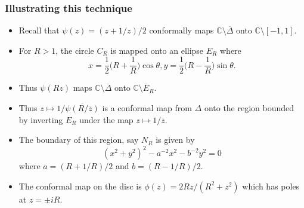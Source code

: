 \documentclass{beamer}
\begin{document}
\begin{frame}
 \frametitle{Illustrating this technique}

\begin{itemize}

\item Recall that $\psi(z) = (z + 1/z)/2$ conformally maps $\mathbb C \setminus \overline \Delta$ onto $\mathbb C \setminus [-1, 1]$.

\item For $R > 1$, the circle $C_R$ is mapped onto an ellipse $E_R$ where
\[
x = \frac{1}{2}\bigg(R + \frac{1}{R} \bigg) \cos \theta, y = \frac{1}{2} \bigg( R - \frac{1}{R} \bigg) \sin \theta.
\]

\item Thus $\psi(Rz)$ maps $\mathbb C \setminus \overline \Delta$ onto $\mathbb C \setminus \overline E_R$.

\end{itemize}

\end{frame}


\begin{frame}

\begin{itemize}

 \item Thus $z \mapsto 1/\overline{\psi (R/ \overline z)}$ is a conformal map from $\Delta$ onto the region bounded by inverting $E_R$ under the map $z \mapsto 1/\overline z$. 

 \item The boundary of this region, say $N_R$ is given by
\[
(x^2 + y^2)^2 - a^{-2} x^2 - b^{-2}y^2 = 0
\]
 where $a =  (R + 1/R)/2$ and $b = (R - 1/R)/2$.

 \item The conformal map on the disc is $\phi(z) = 2Rz/(R^2 + z^2)$ which has poles at $z = \pm i R$.


\end{itemize}

\end{frame}

\end{document}
